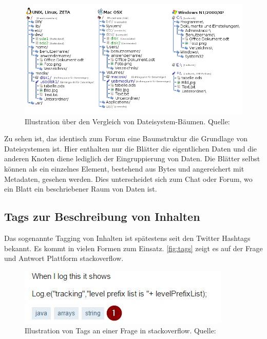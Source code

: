 \documentclass[a4paper]{article}
\begin{document}
	\begin{figure}[H] 
		\includegraphics[width=\linewidth]{../Bilder/filesystem.png}
		\caption{
			Illustration über den Vergleich von Dateisystem-Bäumen.
			Quelle: \cite{filesytsem}
		}
		\label{fig:filesytsem}
	\end{figure}
	
	Zu sehen ist, das identisch zum Forum eine Baumstruktur die Grundlage von
	Dateisystemen ist. Hier enthalten nur die Blätter die eigentlichen Daten und die
	anderen Knoten diene lediglich der Eingruppierung von Daten. Die Blätter selbst
	können als ein einzelnes Element, bestehend aus Bytes und angereichert mit
	Metadaten, gesehen werden. Dies unterscheidet sich zum Chat oder Forum, wo ein
	Blatt ein beschriebener Raum von Daten ist. 
	
	\subsection{Tags zur Beschreibung von Inhalten}
	\label{sec:tags}
	
	Das sogenannte Tagging von Inhalten ist spätestens seit den Twitter Hashtags
	bekannt. Es kommt in vielen Formen zum Einsatz. \autoref{fig:tags} zeigt es
	auf der Frage und Antwort Plattform stackoverflow.
	
	\begin{figure}[H] 
		\centerline{
			\includegraphics[scale=0.95]{../Bilder/tags.jpg}
		}
		\caption{
			Illustration von Tags an einer Frage in stackoverflow.
			Quelle: \cite{stackoverflow}
		}
		\label{fig:tags}
	\end{figure}
	
\end{document}
